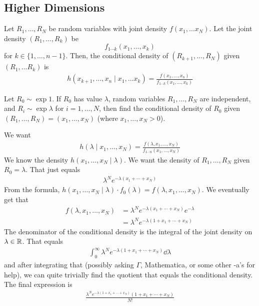 \subsection{Higher Dimensions}
Let $R_1, \ldots, R_N$ be random variables with joint density $f(x_1, \ldots x_N)$. Let the joint density $(R_1, \ldots, R_k)$ be $$f_{1\cdots k}(x_1, \ldots, x_k)$$ for $k \in \{ 1, \ldots, n - 1 \}$. Then, the conditional density of $(R_{k+1}, \ldots, R_N)$ given $(R_1, \ldots R_k)$ is
\begin{align}
    h(x_{k+1}, \ldots, x_n \mid x_1, \ldots x_k) = \frac{f(x_1, \ldots, x_n)}{f_{1\cdots k}(x_1, \ldots, x_k)}
\end{align}
\begin{example}
    Let $R_0 \sim \exp{1}$. If $R_0$ has value $\lambda$, random variables $R_1, \ldots, R_N$ are independent, and $R_i \sim \exp{\lambda}$ for $i = 1, \ldots, N$, then find the conditional density of $R_0$ given $(R_1, \ldots, R_N) = (x_1, \ldots, x_N)$ (where $x_1, \ldots, x_N > 0$).
\end{example}
\begin{solution}
    We want
    \begin{align}
        h(\lambda \mid x_1, \ldots, x_N) = \frac{f(\lambda, x_1, \ldots, x_N)}{f_{1\cdots n}(x_1, \ldots, x_N)}
    \end{align}
    We know the density $h(x_1, \ldots, x_N \mid \lambda)$. We want the density of $R_1, \ldots, R_N$ given $R_0 = \lambda$. That just equals
    \begin{align}
        \lambda^N e^{-\lambda(x_1 + \cdots + x_N)}
    \end{align}
    From the formula, $h(x_1, \ldots, x_N \mid \lambda) \cdot f_0(\lambda) = f(\lambda, x_1, \ldots, x_N)$. We eventually get that
    \begin{align}
        f(\lambda, x_1, \ldots, x_N) &= \lambda^N e^{-\lambda(x_1 + \cdots + x_N)}e^{-\lambda}\\
        &= \lambda^N e^{-\lambda(1 + x_1 + \cdots + x_N)}
    \end{align}
    The denominator of the conditional density is the integral of the joint density on $\lambda \in \mathbb{R}$. That equals
    \begin{align}
        \int_0^\infty \lambda^N e^{-\lambda(1 + x_1 + \cdots + x_N)} \dd{\lambda}
    \end{align}
    and after integrating that (possibly asking $\Gamma$, Mathematica, or some other -a's for help), we can quite trivially find the quotient that equals the conditional density. The final expression is
    \begin{align}
        \frac{\lambda^N e^{-\lambda(1 + x_1 + \cdots + x_N)}(1 + x_1 + \cdots + x_N)}{N!}
    \end{align}
\end{solution}


